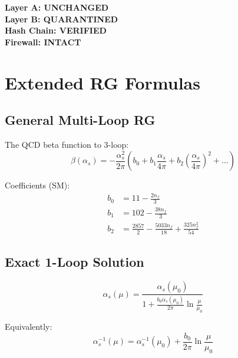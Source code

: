 \documentclass[11pt,a4paper]{article}
\theoremstyle{definition}
\begin{document}
\begin{firewallbox}
\begin{center}
\textbf{Layer A: UNCHANGED} \\
\textbf{Layer B: QUARANTINED} \\
\textbf{Hash Chain: VERIFIED} \\
\textbf{Firewall: INTACT}
\end{center}
\end{firewallbox}

\section{Extended RG Formulas}
\label{sec:extended-rg}

\subsection{General Multi-Loop RG}
\label{subsec:multiloop-rg}

The QCD beta function to 3-loop:
\begin{equation}
\label{eq:beta-3loop}
\beta(\alpha_s) = -\frac{\alpha_s^2}{2\pi}\left(b_0 + b_1\frac{\alpha_s}{4\pi}
  + b_2\left(\frac{\alpha_s}{4\pi}\right)^2 + \ldots\right)
\end{equation}

Coefficients (SM):
\begin{align}
\label{eq:b0-coeff}
b_0 &= 11 - \frac{2n_f}{3} \\
\label{eq:b1-coeff}
b_1 &= 102 - \frac{38n_f}{3} \\
\label{eq:b2-coeff}
b_2 &= \frac{2857}{2} - \frac{5033n_f}{18} + \frac{325n_f^2}{54}
\end{align}

\subsection{Exact 1-Loop Solution}
\label{subsec:exact-1loop}

\begin{equation}
\label{eq:exact-1loop}
\alpha_s(\mu) = \frac{\alpha_s(\mu_0)}{1 + \frac{b_0\alpha_s(\mu_0)}{2\pi}\ln\frac{\mu}{\mu_0}}
\end{equation}

Equivalently:
\begin{equation}
\label{eq:exact-1loop-inv}
\alpha_s^{-1}(\mu) = \alpha_s^{-1}(\mu_0) + \frac{b_0}{2\pi}\ln\frac{\mu}{\mu_0}
\end{equation}
\end{document}
